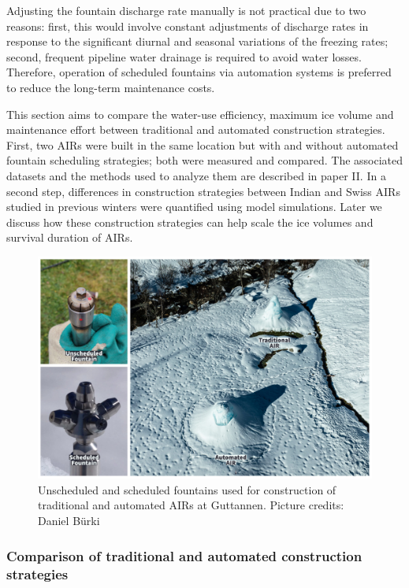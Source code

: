 Adjusting the fountain discharge rate manually is not practical due to two reasons: first, this would involve
constant adjustments of discharge rates in response to the significant diurnal and seasonal variations of the
freezing rates; second, frequent pipeline water drainage is required to avoid water losses. Therefore, operation
of scheduled fountains via automation systems is preferred to reduce the long-term maintenance costs.

This section aims to compare the water-use efficiency, maximum ice volume and maintenance effort between
traditional and automated construction strategies. First, two AIRs were built in the same location but with and
without automated fountain scheduling strategies; both were measured and compared. The associated datasets and
the methods used to analyze them are described in paper II. In a second step, differences in construction
strategies between Indian and Swiss AIRs studied in previous winters were quantified using model simulations.
Later we discuss how these construction strategies can help scale the ice volumes and survival duration of AIRs. 

\begin{figure}[htb]
\includegraphics[width=12cm]{figs/AIR_fountains.jpg}
\caption{Unscheduled and scheduled fountains used for construction of traditional and automated AIRs at Guttannen. Picture credits: Daniel Bürki}
\label{fig:2AIR}
\end{figure}

\subsubsection{Comparison of traditional and automated construction strategies}

